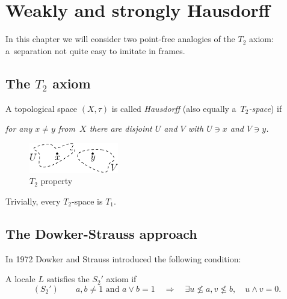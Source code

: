 \chapter{Weakly and strongly Hausdorff}

In this chapter we will consider two point-free analogies of the $T_2$ axiom:
a~separation not quite easy to imitate in frames.

\section{The $T_2$ axiom}

\begin{framed}
  \begin{df}[$T_2$]
    A topological space $(X, \tau)$ is called \emph{Hausdorff\/} (also equally
    a~\emph{$T_2$-space\/}) if
    \begin{center} \it
      for any $x \ne y$ from~$X$ there are disjoint $U$ and $V$ with $U\owns x$
      and $V\owns y$.
    \end{center}
  \end{df}
\end{framed}

\begin{figure}[h]
  \centering
  \includegraphics[height=13mm]{../img/t2.eps}
  \caption{$T_2$ property}
\end{figure}

\begin{rem} \label{T2->T1}
  Trivially, every $T_2$-space is $T_1$.
\end{rem}

\section{The Dowker-Strauss approach}

In 1972 Dowker and Strauss \cite{ds72} introduced the following condition:

\begin{framed}
  \begin{df}
    A locale $L$ satisfies the $S_2'$ axiom if
    \[
      (S_2') \qquad
      a, b \ne 1 \text{ and } a \vee b = 1 \quad \Rightarrow \quad \exists
      u\not\leq a, v\not\leq b, \quad u \wedge v = 0.
    \]
  \end{df}
\end{framed}

